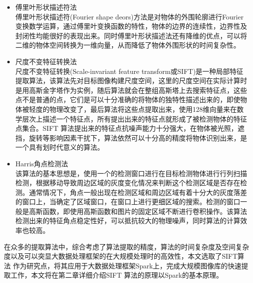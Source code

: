 \begin{itemize}
\item 傅里叶形状描述符法\\傅里叶形状描述符(Fourier shape deors)方法是对物体的外围轮廓进行Fourier变换数学运算，通过傅里叶变换函数的特性，物体的边界的连续性，边界性及封闭性均能很好的表现出来。同时傅里叶形状描述法还有降维的优点，可以将二维的物体空间转换为一维向量，从而降低了物体外围形状的时间复杂性。
\item 尺度不变特征转换法\\尺度不变特征转换(Scale-invariant feature transform或SIFT)是一种局部特征提取算法，该算法先对目标图像构建尺度空间，这里的尺度空间在实际计算时是用高斯金字塔作为实例，随后算法就会在整组高斯塔上去搜索特征点，这些点不是普通的点，它们是可以十分准确的将物体的独特性描述出来的，即使物体被轻度的物理改变了，最后算法将这些点提取出来，使用128维向量来在数学层次上描述一个特征点，所有提出出来的特征点就形成了被检测物体的特征点集合。SIFT 算法提出来的特征点抗噪声能力十分强大，在物体被光照，遮挡，旋转等影响因素干扰下，算法依然可以十分高的精度将物体识别出来，是一个具有划时代意义的算法。
\item Harris角点检测法\\该算法的基本思想是，使用一个的检测窗口进行在目标检测物体进行行列扫描检测，根据移动导致周边区域的灰度变化情况来判断这个检测区域是否存在检测。通常情况下，角点一般出现在检测区域和周边区域有着十分大的灰度落差的窗口上，当确定了区域窗口，在窗口上进行更细区域的搜索。检测的窗口一般是高斯函数，即使用高斯函数和图片的固定区域不断进行卷积操作。该算法检测出来的特征角点稳定性好，可以抵抗较大的物理噪声，同时算法的计算效率也较高。
\end{itemize}

在众多的提取算法中，综合考虑了算法提取的精度，算法的时间复杂度及空间复杂度以及可以突显大数据处理框架的在大规模处理时的高效性，本文选取了SIFT算法 作为研究点，将其应用于大数据处理框架Spark上，完成大规模图像库的快速提取工作，本文将在第二章详细介绍SIFT 算法的原理以Spark的基本原理。

